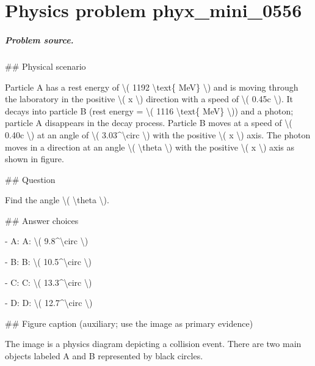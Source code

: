 
\chapter{Physics problem phyx\_mini\_0556}
\label{ch:PhyXMiniProblems_problem_phyx_mini_0556}

\paragraph{Problem source.}
\#\# Physical scenario

Particle A has a rest energy of \textbackslash{}( 1192 \textbackslash{}text\{ MeV\} \textbackslash{}) and is moving through the laboratory in the positive \textbackslash{}( x \textbackslash{}) direction with a speed of \textbackslash{}( 0.45c \textbackslash{}). It decays into particle B (rest energy = \textbackslash{}( 1116 \textbackslash{}text\{ MeV\} \textbackslash{})) and a photon; particle A disappears in the decay process. Particle B moves at a speed of \textbackslash{}( 0.40c \textbackslash{}) at an angle of \textbackslash{}( 3.03\textasciicircum{}\textbackslash{}circ \textbackslash{}) with the positive \textbackslash{}( x \textbackslash{}) axis. The photon moves in a direction at an angle \textbackslash{}( \textbackslash{}theta \textbackslash{}) with the positive \textbackslash{}( x \textbackslash{}) axis as shown in figure.

\#\# Question

Find the angle \textbackslash{}( \textbackslash{}theta \textbackslash{}).

\#\# Answer choices

- A: A: \textbackslash{}( 9.8\textasciicircum{}\textbackslash{}circ \textbackslash{})

- B: B: \textbackslash{}( 10.5\textasciicircum{}\textbackslash{}circ \textbackslash{})

- C: C: \textbackslash{}( 13.3\textasciicircum{}\textbackslash{}circ \textbackslash{})

- D: D: \textbackslash{}( 12.7\textasciicircum{}\textbackslash{}circ \textbackslash{})

\#\# Figure caption (auxiliary; use the image as primary evidence)

The image is a physics diagram depicting a collision event. There are two main objects labeled A and B represented by black circles. 

